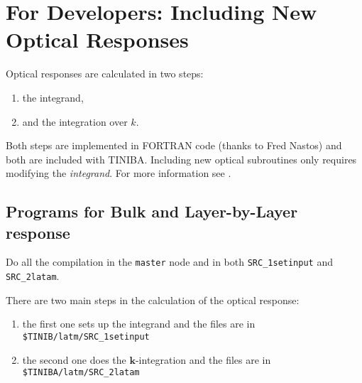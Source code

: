 \chapter{For Developers: Including New Optical Responses}

Optical responses are calculated in two steps:

\begin{enumerate}
\item the integrand,
\item and the integration over $k$.
\end{enumerate}

Both steps are implemented in FORTRAN code (thanks to Fred Nastos) and both are included with TINIBA. Including new optical subroutines only requires modifying the \emph{integrand}. For more information see \cite{sipe_second-order_2000}.

\section{Programs for Bulk and Layer-by-Layer response}
\label{sec:programs}

Do all the compilation in the \verb=master= node and in both 
\verb=SRC_1setinput=
and
\verb=SRC_2latam=.

There are two main steps in the calculation of the optical response:

\begin{enumerate}

\item the first one sets up the integrand and the
files are in\\
\verb=$TINIB/latm/SRC_1setinput=
\item the second one does the $\mathbf{k}$-integration and the files
  are in\\
\verb=$TINIBA/latm/SRC_2latam=
\end{enumerate}

